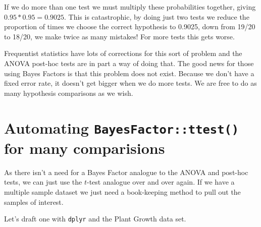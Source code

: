 \documentclass[
]{book}
\newenvironment{Shaded}{\begin{snugshade}}{\end{snugshade}}
\newcommand{\DataTypeTok}[1]{\textcolor[rgb]{0.13,0.29,0.53}{#1}}
\newcommand{\KeywordTok}[1]{\textcolor[rgb]{0.13,0.29,0.53}{\textbf{#1}}}
\newcommand{\NormalTok}[1]{#1}
\newcommand{\OperatorTok}[1]{\textcolor[rgb]{0.81,0.36,0.00}{\textbf{#1}}}
\newcommand{\StringTok}[1]{\textcolor[rgb]{0.31,0.60,0.02}{#1}}
\begin{document}
If we do more than one test we must multiply these probabilities together, giving \(0.95 * 0.95 = 0.9025\). This is catastrophic, by doing just two tests we reduce the proportion of times we choose the correct hypothesis to 0.9025, down from 19/20 to 18/20, we make twice as many mistakes! For more tests this gets worse.

Frequentist statistics have lots of corrections for this sort of problem and the ANOVA post-hoc tests are in part a way of doing that. The good news for those using Bayes Factors is that this problem does not exist. Because we don't have a fixed error rate, it doesn't get bigger when we do more tests. We are free to do as many hypothesis comparisons as we wish.

\hypertarget{automating-bayesfactorttest-for-many-comparisions}{%
\section{\texorpdfstring{Automating \texttt{BayesFactor::ttest()} for many comparisions}{Automating BayesFactor::ttest() for many comparisions}}\label{automating-bayesfactorttest-for-many-comparisions}}

As there isn't a need for a Bayes Factor analogue to the ANOVA and post-hoc tests, we can just use the \(t\)-test analogue over and over again. If we have a multiple sample dataset we just need a book-keeping method to pull out the samples of interest.

Let's draft one with \texttt{dplyr} and the Plant Growth data set.

\begin{Shaded}
\end{Shaded}
\end{document}

